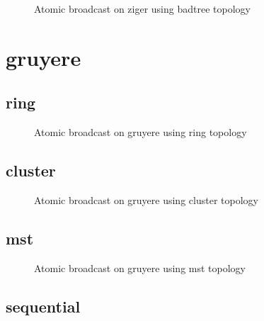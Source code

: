 \begin{figure}[h!]
\begin{tikzpicture}[transform shape,scale=.25]

\end{tikzpicture}

\caption{Atomic broadcast on ziger using badtree topology}
\label{fig:ab_ziger_badtree}
\end{figure}
\clearpage\newpage\clearpage\section{gruyere}

\subsection{ring}

\begin{figure}[h!]
\begin{tikzpicture}[transform shape,scale=.25]

\end{tikzpicture}

\caption{Atomic broadcast on gruyere using ring topology}
\label{fig:ab_gruyere_ring}
\end{figure}
\clearpage\subsection{cluster}

\begin{figure}[h!]
\begin{tikzpicture}[transform shape,scale=.25]

\end{tikzpicture}

\caption{Atomic broadcast on gruyere using cluster topology}
\label{fig:ab_gruyere_cluster}
\end{figure}
\clearpage\subsection{mst}

\begin{figure}[h!]
\begin{tikzpicture}[transform shape,scale=.25]

\end{tikzpicture}

\caption{Atomic broadcast on gruyere using mst topology}
\label{fig:ab_gruyere_mst}
\end{figure}
\clearpage\subsection{sequential}

